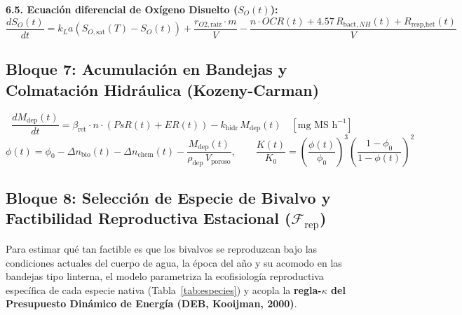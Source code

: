 \documentclass[11pt,letterpaper]{article}
\begin{document}
\begin{formulabox}
\textbf{6.5. Ecuación diferencial de Oxígeno Disuelto ($S_O(t)$):}
\begin{equation}
\frac{dS_O(t)}{dt} = k_L a\left(S_{O,\text{sat}}(T) - S_O(t)\right) + \frac{r_{O2,\text{raiz}}\cdot m}{V} - \frac{n \cdot OCR(t) + 4.57\,R_{\text{bact},NH}(t) + R_{\text{resp,het}}(t)}{V}
\label{eq:dso}
\end{equation}
\end{formulabox}

\subsection{Bloque 7: Acumulación en Bandejas y Colmatación Hidráulica (Kozeny-Carman)}

\begin{formulabox}
\begin{equation}
\frac{dM_{\text{dep}}(t)}{dt} = \beta_{\text{ret}} \cdot n \cdot \left(PsR(t) + ER(t)\right) - k_{\text{hidr}}\,M_{\text{dep}}(t) \quad [\text{mg MS h}^{-1}]
\label{eq:dmdep}
\end{equation}
\begin{equation}
\phi(t) = \phi_0 - \Delta n_{\text{bio}}(t) - \Delta n_{\text{chem}}(t) - \frac{M_{\text{dep}}(t)}{\rho_{\text{dep}}\,V_{\text{poroso}}}, \qquad \frac{K(t)}{K_0} = \left(\frac{\phi(t)}{\phi_0}\right)^3 \left(\frac{1 - \phi_0}{1 - \phi(t)}\right)^2
\label{eq:kozeny}
\end{equation}
\end{formulabox}

\subsection{Bloque 8: Selección de Especie de Bivalvo y Factibilidad Reproductiva Estacional ($\mathcal{F}_{\text{rep}}$)}

Para estimar qué tan factible es que los bivalvos se reproduzcan bajo las condiciones actuales del cuerpo de agua, la época del año y su acomodo en las bandejas tipo linterna, el modelo parametriza la ecofisiología reproductiva específica de cada especie nativa (Tabla~\ref{tab:especies}) y acopla la \textbf{regla-$\kappa$ del Presupuesto Dinámico de Energía (DEB, Kooijman, 2000)}.
\end{document}
